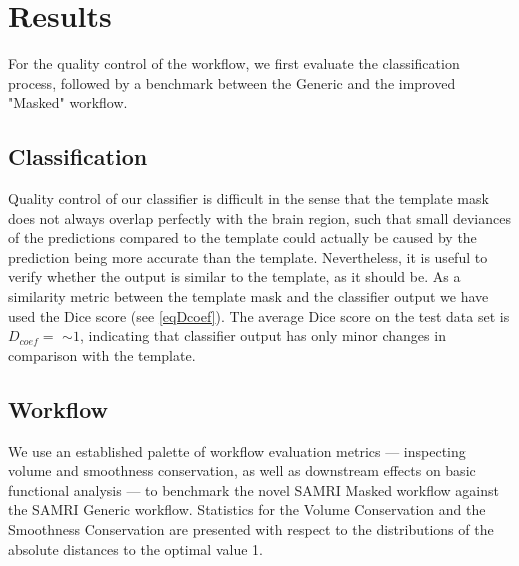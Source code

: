 \section{Results}
For the quality control of the workflow, we first evaluate the classification process, followed by a benchmark between the Generic and the improved "Masked" workflow.

\subsection{Classification}
Quality control of our classifier is difficult in the sense that the template mask does not always overlap perfectly with the brain region, such that small deviances of the predictions compared to the template could actually be caused by the prediction being more accurate than the template.
Nevertheless, it is useful to verify whether the output is similar to the template, as it should be.
As a similarity metric between the template mask and the classifier output we have used the Dice score (see \cref{eqDcoef}).
The average Dice score on the test data set is $D_{coef}= $  $\sim 1$, indicating that classifier output has only minor changes in comparison with the template.

\begin{sansmath}
\end{sansmath}

\subsection{Workflow}
We use an established palette of workflow evaluation metrics --- inspecting volume and smoothness conservation, as well as downstream effects on basic functional analysis \cite{ioanas_optimized_2019} --- to benchmark the novel SAMRI Masked workflow against the SAMRI Generic workflow.
Statistics for the Volume Conservation and the Smoothness Conservation are presented with respect to the distributions of the absolute distances to the optimal value 1.

